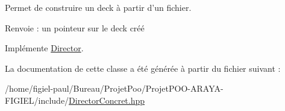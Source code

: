 Permet de construire un deck à partir d'un fichier. 

\begin{DoxyReturn}{Renvoie}
\-: un pointeur sur le deck créé 
\end{DoxyReturn}


Implémente \hyperlink{class_director_aea0cbfa1badb2688676406bf47fc7b62}{Director}.



La documentation de cette classe a été générée à partir du fichier suivant \-:\begin{DoxyCompactItemize}
\item 
/home/figiel-\/paul/\-Bureau/\-Projet\-Poo/\-Projet\-P\-O\-O-\/\-A\-R\-A\-Y\-A-\/\-F\-I\-G\-I\-E\-L/include/\hyperlink{_director_concret_8hpp}{Director\-Concret.\-hpp}\end{DoxyCompactItemize}
